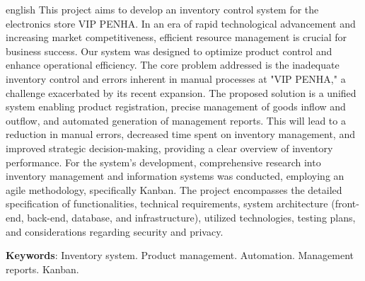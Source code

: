 \documentclass[
	12pt,				%
	openany,			%
	twoside,			%
	a4paper,			%
	english,			%
	brazil				%
	]{abntex2}
\newcommand{\listofquadrosname}{Lista de quadros}
\let\cleardoublepage\clearpage
\begin{document}
\begin{resumo}[Abstract]
 \begin{otherlanguage*}{english}
  This project aims to develop an inventory control system for the electronics store VIP PENHA. In an era of rapid technological advancement and increasing market competitiveness, efficient resource management is crucial for business success. Our system was designed to optimize product control and enhance operational efficiency.
The core problem addressed is the inadequate inventory control and errors inherent in manual processes at "VIP PENHA," a challenge exacerbated by its recent expansion. The proposed solution is a unified system enabling product registration, precise management of goods inflow and outflow, and automated generation of management reports. This will lead to a reduction in manual errors, decreased time spent on inventory management, and improved strategic decision-making, providing a clear overview of inventory performance.
For the system's development, comprehensive research into inventory management and information systems was conducted, employing an agile methodology, specifically Kanban. The project encompasses the detailed specification of functionalities, technical requirements, system architecture (front-end, back-end, database, and infrastructure), utilized technologies, testing plans, and considerations regarding security and privacy.

   \vspace{\onelineskip}
 
   \noindent 
   \textbf{Keywords}: Inventory system. Product management. Automation. Management reports. Kanban.
 \end{otherlanguage*}
\end{resumo}



\listoffigures*
\clearpage

\pdfbookmark[0]{\listofquadrosname}{loq}
\listofquadros*
\cleardoublepage

\listoftables*
\cleardoublepage



\tableofcontents*
\cleardoublepage
\end{document}
